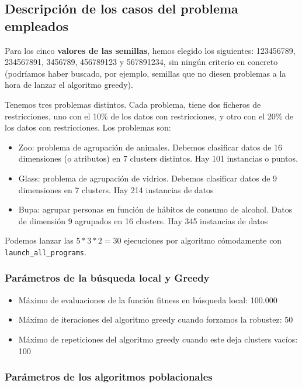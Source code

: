 \documentclass[11pt]{article}
\begin{document}
\subsection{Descripción de los casos del problema empleados}

Para los cinco \textbf{valores de las semillas}, hemos elegido los siguientes: 123456789, 234567891, 3456789, 456789123 y 567891234, sin ningún criterio en concreto (podríamos haber buscado, por ejemplo, semillas que no diesen problemas a la hora de lanzar el algoritmo greedy).

Tenemos tres problemas distintos. Cada problema, tiene dos ficheros de restricciones, uno con el 10\% de los datos con restricciones, y otro con el 20\% de los datos con restricciones. Los problemas son:

\begin{itemize}
    \item Zoo: problema de agrupación de animales. Debemos clasificar datos de 16 dimensiones (o atributos) en 7 clusters distintos. Hay 101 instancias o puntos.
    \item Glass: problema de agrupación de vidrios. Debemos clasificar datos de 9 dimensiones en 7 clusters. Hay 214 instancias de datos
    \item Bupa: agrupar personas en función de hábitos de consumo de alcohol. Datos de dimensión 9 agrupados en 16 clusters. Hay 345 instancias de datos
\end{itemize}

Podemos lanzar las $5 * 3 * 2 = 30$ ejecuciones por algoritmo cómodamente con \lstinline{launch_all_programs}.

\subsubsection{Parámetros de la búsqueda local y Greedy}

\begin{itemize}
\item Máximo de evaluaciones de la función fitness en búsqueda local: 100.000
    \item Máximo de iteraciones del algoritmo greedy cuando forzamos la robustez: 50
    \item Máximo de repeticiones del algoritmo greedy cuando este deja clusters vacíos: 100
\end{itemize}

\subsubsection{Parámetros de los algoritmos poblacionales} \label{section:parametros_poblacionales}
\end{document}
